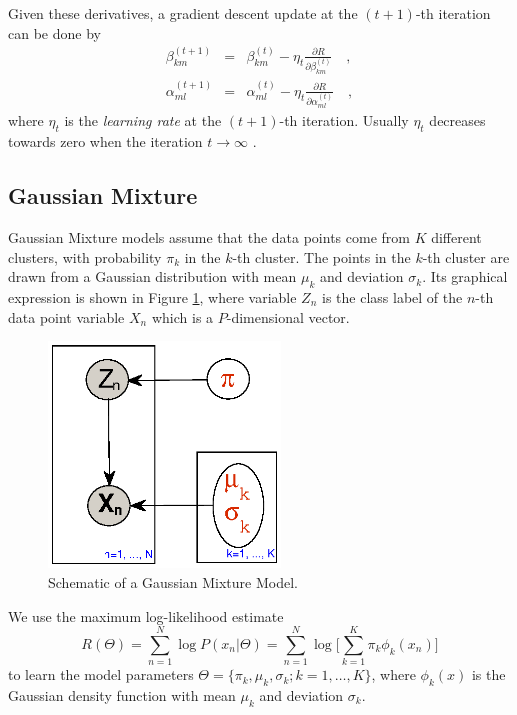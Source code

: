\documentclass{article}
\begin{document}
Given these derivatives, a gradient descent update at the $(t+1)$-th iteration can be done by
\begin{eqnarray}
\beta_{km}^{(t+1)} &=& \beta_{km}^{(t)} - \eta_t \frac{\partial R}{\partial \beta_{km}^{(t)}} \quad , \\
\alpha_{ml}^{(t+1)} &=& \alpha_{ml}^{(t)} - \eta_t \frac{\partial R}{\partial \alpha_{ml}^{(t)}}\quad ,
\end{eqnarray}
where $\eta_t$ is the \textit{learning rate} at the $(t+1)$-th iteration.
Usually $\eta_t$ decreases towards zero when the iteration $t\rightarrow \infty$ \cite{Hastie}.


\subsection{Gaussian Mixture}
Gaussian Mixture models assume that the data points come from $K$ different clusters,
with probability $\pi_k$ in the $k$-th cluster.
The points in the $k$-th cluster are drawn from a Gaussian distribution with mean $\mu_k$
and deviation $\sigma_k$.
Its graphical expression is shown in Figure \ref{gaussian},
where variable $Z_n$ is the class label of the $n$-th data point variable $X_n$ which is a $P$-dimensional vector.
\begin{figure}[h]
\centering
\includegraphics[trim=300 205 220 100,width=0.55\textwidth]{gaussian_mixture2.eps}
\caption{Schematic of a Gaussian Mixture Model.}\label{gaussian}
\end{figure}

We use the maximum log-likelihood estimate
\begin{equation}
R(\Theta) = \sum_{n=1}^N \log P(x_n|\Theta)
= \sum_{n=1}^N \log \big[ \sum_{k=1}^K \pi_k \phi_k(x_n) \big]
\end{equation}
to learn the model parameters
$\Theta=\{\pi_k,\mu_k,\sigma_k; k = 1,\ldots,K\}$,
where $\phi_k(x)$ is the Gaussian density function with mean $\mu_k$ and deviation $\sigma_k$.
\end{document}
